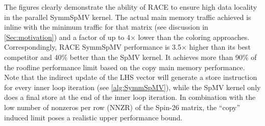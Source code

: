 The figures clearly demonstrate the ability of \acrshort{RACE} to ensure high data locality in the parallel \acrshort{SymmSpMV} kernel. The actual main memory traffic achieved is inline with the minimum traffic for that matrix (see discussion in \cref{Sec:motivation}) and a factor of up to 4$\times$ lower than the coloring approaches. Correspondingly, \acrshort{RACE} \acrshort{SymmSpMV} performance is 3.5$\times$ higher than its best competitor and 40\% better than the \acrshort{SpMV} kernel. It achieves more than 90\% of the roofline performance limit based on the copy main memory performance. Note that the indirect update of the LHS vector will generate a store instruction for every inner loop iteration (see \cref{alg:SymmSpMV}), while the \acrshort{SpMV} kernel only does a final store at the end of the inner loop iteration. In combination with the low number of nonzeros per row (\acrshort{NNZR}) of the Spin-26 matrix, the ``copy'' induced limit poses a realistic upper performance bound.  
%
